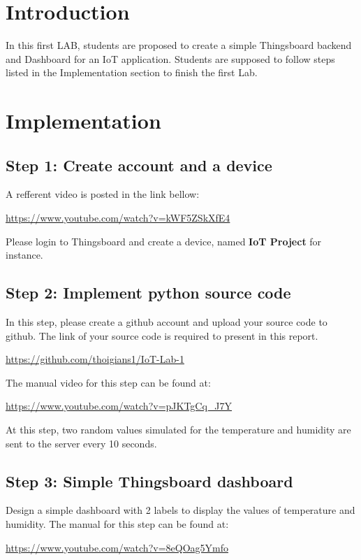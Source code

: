 \documentclass[a4paper,11pt]{article}
\theoremstyle{mytheor}
\begin{document}
\renewcommand{\contentsname}{Content}
\newpage
\vspace{1cm}
\tableofcontents
\newpage

\section{Introduction}
In this first LAB, students are proposed to create a simple Thingsboard backend and Dashboard for an IoT application. Students are supposed to follow steps listed in the Implementation section to finish the first Lab.

\section{Implementation}

\subsection{Step 1: Create account and a device}
A refferent video is posted in the link bellow:
\begin{center}
    \url{https://www.youtube.com/watch?v=kWF5ZSkXfE4}
\end{center}

Please login to Thingsboard and create a device, named \textbf{IoT Project} for instance. 


\subsection{Step 2: Implement python source code}
In this step, please create a github account and upload your source code to github. The link of your source code is required to present in this report.

\begin{center}
    \url{https://github.com/thoigians1/IoT-Lab-1}
\end{center}

The manual video for this step can be found at:
\begin{center}
    \url{https://www.youtube.com/watch?v=pJKTgCq\_J7Y}
\end{center}

At this step, two random values simulated for the temperature and humidity are sent to the server every 10 seconds.

\subsection{Step 3: Simple Thingsboard dashboard}
Design a simple dashboard with 2 labels to display the values of temperature and humidity. The manual for this step can be found at:
\begin{center}
    \url{https://www.youtube.com/watch?v=8eQOag5Ymfo}
\end{center}
\end{document}
